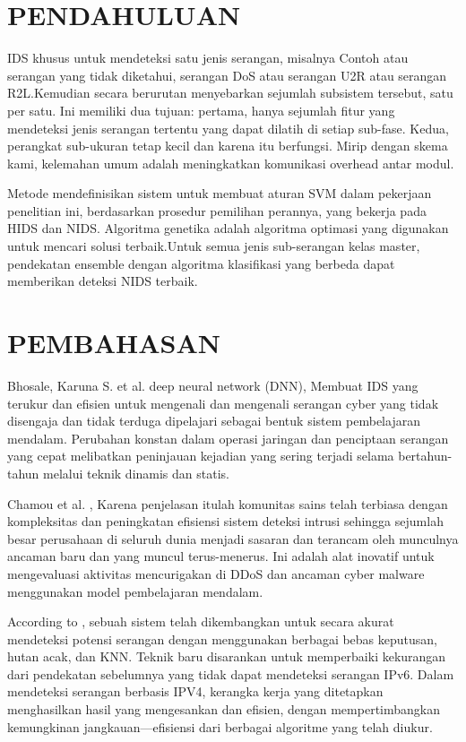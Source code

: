 \documentclass[conference]{IEEEtran}
\begin{document}
{\section{PENDAHULUAN}
IDS khusus untuk mendeteksi satu jenis serangan,
misalnya Contoh atau serangan yang tidak diketahui, serangan DoS atau serangan U2R atau serangan R2L.Kemudian secara berurutan menyebarkan sejumlah subsistem tersebut, satu per satu. Ini memiliki dua tujuan: pertama, hanya sejumlah fitur yang mendeteksi jenis serangan tertentu yang dapat dilatih di setiap sub-fase. Kedua, perangkat sub-ukuran tetap kecil dan karena itu berfungsi. Mirip dengan skema kami, kelemahan umum adalah meningkatkan komunikasi overhead antar modul.

Metode mendefinisikan sistem untuk membuat aturan SVM dalam pekerjaan penelitian ini, berdasarkan prosedur pemilihan perannya, yang bekerja pada HIDS dan NIDS. Algoritma genetika adalah algoritma optimasi yang digunakan untuk mencari solusi terbaik.Untuk semua jenis sub-serangan kelas master, pendekatan ensemble dengan algoritma klasifikasi yang berbeda dapat memberikan deteksi NIDS terbaik.

\section{PEMBAHASAN}

Bhosale, Karuna S. et al. \cite {bhosale2018modified} deep neural network (DNN), Membuat IDS yang terukur dan efisien untuk mengenali dan mengenali serangan cyber yang tidak disengaja dan tidak terduga dipelajari sebagai bentuk sistem pembelajaran mendalam. Perubahan konstan dalam operasi jaringan dan penciptaan serangan yang cepat melibatkan peninjauan kejadian yang sering terjadi selama bertahun-tahun melalui teknik dinamis dan statis.

Chamou et al. \cite {chamou2019intrusion}, Karena penjelasan itulah komunitas sains telah terbiasa dengan kompleksitas dan peningkatan efisiensi sistem deteksi intrusi sehingga sejumlah besar perusahaan di seluruh dunia menjadi sasaran dan terancam oleh munculnya ancaman baru dan yang muncul terus-menerus. Ini adalah alat inovatif untuk mengevaluasi aktivitas mencurigakan di DDoS dan ancaman cyber malware menggunakan model pembelajaran mendalam.

According to \cite {anbar2016comparative}, sebuah sistem telah dikembangkan untuk secara akurat mendeteksi potensi serangan dengan menggunakan berbagai bebas keputusan, hutan acak, dan KNN. Teknik baru disarankan untuk memperbaiki kekurangan dari pendekatan sebelumnya yang tidak dapat mendeteksi serangan IPv6. Dalam mendeteksi serangan berbasis IPV4, kerangka kerja yang ditetapkan menghasilkan hasil yang mengesankan dan efisien, dengan mempertimbangkan kemungkinan jangkauan—efisiensi dari berbagai algoritme yang telah diukur. 

}
\end{document}
